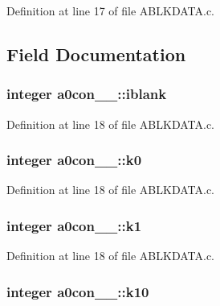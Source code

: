 Definition at line 17 of file A\+B\+L\+K\+D\+A\+T\+A.\+c.



\subsection{Field Documentation}
\subsubsection[{\texorpdfstring{iblank}{iblank}}]{\setlength{\rightskip}{0pt plus 5cm}integer a0con\+\_\+\_\+\+::iblank}\hypertarget{structa0con__1___a4bb5666fbdb7dce2c7f4fe9ab7faa894}{}\label{structa0con__1___a4bb5666fbdb7dce2c7f4fe9ab7faa894}


Definition at line 18 of file A\+B\+L\+K\+D\+A\+T\+A.\+c.

\subsubsection[{\texorpdfstring{k0}{k0}}]{\setlength{\rightskip}{0pt plus 5cm}integer a0con\+\_\+\_\+\+::k0}\hypertarget{structa0con__1___a8de587f4fd3743963161a54d352aa45b}{}\label{structa0con__1___a8de587f4fd3743963161a54d352aa45b}


Definition at line 18 of file A\+B\+L\+K\+D\+A\+T\+A.\+c.

\subsubsection[{\texorpdfstring{k1}{k1}}]{\setlength{\rightskip}{0pt plus 5cm}integer a0con\+\_\+\_\+\+::k1}\hypertarget{structa0con__1___a3e099be2c6bb80173a4054def22b3508}{}\label{structa0con__1___a3e099be2c6bb80173a4054def22b3508}


Definition at line 18 of file A\+B\+L\+K\+D\+A\+T\+A.\+c.

\subsubsection[{\texorpdfstring{k10}{k10}}]{\setlength{\rightskip}{0pt plus 5cm}integer a0con\+\_\+\_\+\+::k10}\hypertarget{structa0con__1___a7bab7601ddcc4c16b3758df7917fa75a}{}\label{structa0con__1___a7bab7601ddcc4c16b3758df7917fa75a}


